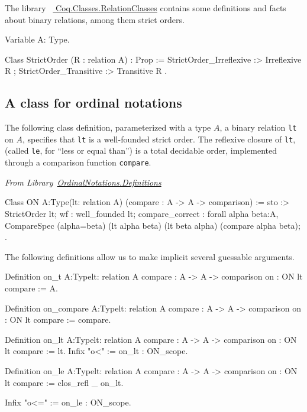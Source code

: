 The library ~\href{https://coq.inria.fr/distrib/current/stdlib/Coq.Classes.RelationClasses.html}{%
Coq.Classes.RelationClasses} contains some definitions and facts about binary relations, among them strict orders.


\begin{Coqsrc}
Variable A: Type.

  Class StrictOrder (R : relation A) : Prop := {
    StrictOrder_Irreflexive :> Irreflexive R ;
    StrictOrder_Transitive :> Transitive R }.
\end{Coqsrc}



\subsection{A class for ordinal notations}

The following class definition, parameterized with a type $A$, a binary relation \texttt{lt} on $A$, specifies that \texttt{lt} is a well-founded strict order. The reflexive closure of \texttt{lt}, (called \texttt{le}, for ``less  or equal than'') is a total decidable order, implemented through a comparison function \texttt{compare}. 

\vspace{4pt}
\noindent\emph{From Library~\href{../src/html/hydras.OrdinalNotations.Definitions.html}{OrdinalNotations.Definitions}}

\label{types:ON}

\begin{Coqsrc}
Class ON {A:Type}(lt: relation A)
      (compare : A -> A -> comparison)  :=
  {
  sto :> StrictOrder lt;
  wf : well_founded lt;
  compare_correct :
    forall alpha beta:A,
      CompareSpec (alpha=beta) (lt alpha beta) (lt beta alpha)
                  (compare alpha beta);
  }.
\end{Coqsrc}

The following definitions allow us to make implicit several guessable arguments.
\label{sect:on-lt-notation}
\label{sect:on-le-notation}
\begin{Coqsrc}
Definition on_t  {A:Type}{lt: relation A}
            {compare : A -> A -> comparison}
            {on : ON lt compare} := A.

Definition on_compare {A:Type}{lt: relation A}
            {compare : A -> A -> comparison}
            {on : ON lt compare} := compare.

Definition on_lt {A:Type}{lt: relation A}
           {compare : A -> A -> comparison}
           {on : ON lt compare} := lt.
Infix "o<" := on_lt : ON_scope.

Definition on_le  {A:Type}{lt: relation A}
           {compare : A -> A -> comparison}
           {on : ON lt compare} :=
  clos_refl _ on_lt.

Infix "o<=" := on_le : ON_scope.
\end{Coqsrc}



